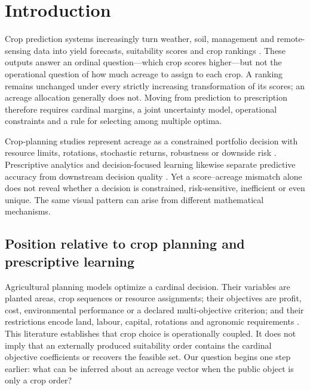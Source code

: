 \section{Introduction}

Crop prediction systems increasingly turn weather, soil, management and remote-sensing data into yield forecasts, suitability scores and crop rankings \citep{liakos2018machine,vanklompenburg2020crop}. These outputs answer an ordinal question---which crop scores higher---but not the operational question of how much acreage to assign to each crop. A ranking remains unchanged under every strictly increasing transformation of its scores; an acreage allocation generally does not. Moving from prediction to prescription therefore requires cardinal margins, a joint uncertainty model, operational constraints and a rule for selecting among multiple optima.

Crop-planning studies represent acreage as a constrained portfolio decision with resource limits, rotations, stochastic returns, robustness or downside risk \citep{filippi2017mixed,boyabatli2019crop,benini2023crop,randall2022robust,randall2024systematic}. Prescriptive analytics and decision-focused learning likewise separate predictive accuracy from downstream decision quality \citep{bertsimas2020predictive,elmachtoub2022smart,wilder2019melding,mandi2023decision}. Yet a score--acreage mismatch alone does not reveal whether a decision is constrained, risk-sensitive, inefficient or even unique. The same visual pattern can arise from different mathematical mechanisms.

\subsection{Position relative to crop planning and prescriptive learning}

Agricultural planning models optimize a cardinal decision. Their variables are planted areas, crop sequences or resource assignments; their objectives are profit, cost, environmental performance or a declared multi-objective criterion; and their restrictions encode land, labour, capital, rotations and agronomic requirements \citep{filippi2017mixed,boyabatli2019crop,benini2023crop}. This literature establishes that crop choice is operationally coupled. It does not imply that an externally produced suitability order contains the cardinal objective coefficients or recovers the feasible set. Our question begins one step earlier: what can be inferred about an acreage vector when the public object is only a crop order?

